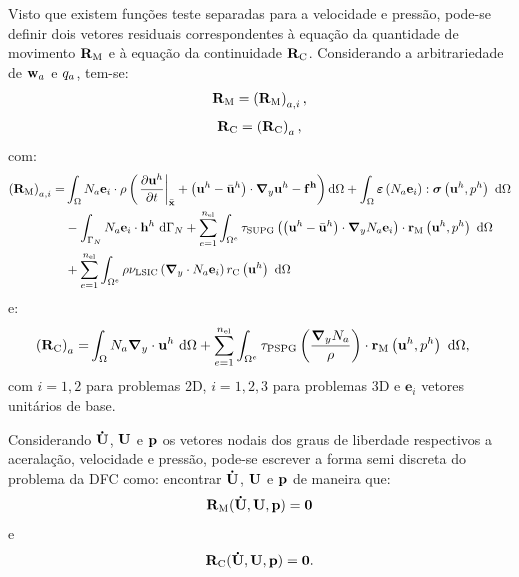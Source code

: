 Visto que existem funções teste separadas para a velocidade e pressão, pode-se definir dois vetores residuais correspondentes à equação da quantidade de movimento $\mathbf{R}_\mathrm{M}$ e à equação da continuidade $\mathbf{R}_\mathrm{C}$. Considerando a arbitrariedade de $\mathbf{w}_{a}$ e $q_{a}$, tem-se:
\begin{align}
	\mathbf{R}_\mathrm{M}  = \left(\mathbf{R}_\mathrm{M}\right)_{a,i},
\end{align}
\begin{align}
	\mathbf{R}_\mathrm{C} =  \left(\mathbf{R}_\mathrm{C}\right)_{a},
\end{align}
\noindent com:
\begin{align}
	\begin{split}
		\left(\NNSM\right)_{a,i} =&\int_{\domain} \shapef_{a}\mathbf{e}_i \cdot \density\left(\left. \frac{\partial\velocityh}{\partial t}\right|_{\posALE}+\left(\velocityh - \velocityALEh \right)\cdot \gradient \velocityh - \sbodyforceh\right) \deriv \domain +\int_{\domain} \straintensor \left(\shapef_{a}\mathbf{e}_i\right) : \stressTensor \left(\velocityh,\pressh\right)\ \deriv \domain\\ &
		- \int_{\boundaryN}\shapef_{a}\mathbf{e}_i \cdot \surfaceLoadh \ \deriv \boundaryN 
		+ \sum_{e=1}^{\nel} \int_{\domainE} \SUPG \left(\left(\velocityh - \velocityALEh \right) \cdot \gradient \shapef_{a}\mathbf{e}_i\right) \cdot \resMom\left(\velocityh,\pressh \right)\  \deriv \domain\\
		&+ \sum_{e=1}^{\nel} \int_{\domainE} \density \LSIC \left(\divergence \cdot \shapef_{a}\mathbf{e}_i\right) \resPre\left(\velocityh\right)\  \deriv \domain
	\end{split}
\end{align}
\noindent e:
\begin{align}
	\begin{split}
		\left(\mathbf{R}_\mathrm{C}\right)_{a} = &\int_{\Omega} N_{a} \boldsymbol{\nabla}_y \cdot \mathbf{u}^h \ \mathrm{d} \Omega  
		+ \sum_{e=1}^{n_{\mathrm{el}}} \int_{\Omega^e} \tau_{\mathrm{PSPG}} \left(\frac{\boldsymbol{\nabla}_y N_{a}}{\rho}\right) \cdot \mathbf{r}_{\mathrm{M}}\left(\mathbf{u}^h,p^h\right) \  \mathrm{d} \Omega,
	\end{split}
\end{align}
\noindent com $i=1,2$ para problemas 2D, $i=1,2,3$ para problemas 3D e $\mathbf{e}_i$ vetores unitários de base.

Considerando $\mathbf{\dot{U}}$, $\mathbf{U}$ e $\mathbf{p}$ os vetores nodais dos graus de liberdade respectivos a aceralação, velocidade e pressão, pode-se escrever a forma semi discreta do problema da DFC como: encontrar $\mathbf{\dot{U}}$, $\mathbf{U}$ e $\mathbf{p}$ de maneira que:
\begin{align}
	\mathbf{R}_\mathrm{M}(\mathbf{\dot{U}},\mathbf{U},\mathbf{p}) = \mathbf{0}\label{eq:resid_semi_discr_QM}
\end{align}
\noindent e
\begin{align}
	\mathbf{R}_\mathrm{C}(\mathbf{\dot{U}},\mathbf{U},\mathbf{p}) = \mathbf{0}. \label{eq:resid_semi_discr_C}
\end{align}

